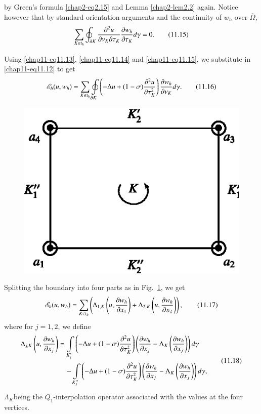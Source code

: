 by Green's formula \eqref{chap2-eq2.15} and Lemma \ref{chap2-lem2.2}
again. Notice however that by standard orientation arguments and the
continuity of $w_{h}$ over $\overline{\Omega}$,
\begin{equation*}
\sum_{K\in\mathfrak{t}_{h}}\oint_{\partial K}\frac{\partial^{2}u}{\partial \nu_{K}\partial
  \tau_{K}}\frac{\partial w_{h}}{\partial
  \tau_{K}}d\gamma=0.\tag{11.15}\label{chap11-eq11.15} 
\end{equation*}

Using \eqref{chap11-eq11.13}, \eqref{chap11-eq11.14} and
\eqref{chap11-eq11.15}, we substitute in \eqref{chap11-eq11.12} to get
\begin{equation*}
\mathscr{E}_{h}(u,w_{h})=\sum_{K\in\mathfrak{t}_{h}}\oint\limits_{\partial
  K}\left(-\Delta u+(1-\sigma)\frac{\partial^{2}u}{\partial
  \tau^{2}_{K}}\right)\frac{\partial w_{h}}{\partial
  \nu_{K}}d\gamma.\tag{11.16}\label{chap11-eq11.16} 
\end{equation*}
\begin{figure}[H]
\centering
\includegraphics{figure/fig11.2.eps}
\caption{}\label{chap11-fig11.2}
\end{figure}

Splitting the boundary into four parts as in
Fig.~\ref{chap11-fig11.2}, we get
\begin{equation*}
\mathscr{E}_{h}(u,w_{h})=\sum_{K\in\mathfrak{t}_{h}}\left(\Delta_{1,K}\left(u,\frac{\partial
  w_{h}}{\partial x_{1}}\right)+\Delta_{2,K}\left(u,\frac{\partial w_{h}}{\partial
  x_{2}}\right)\right),\tag{11.17}\label{chap11-eq11.17} 
\end{equation*}
where for $j=1,2$, we define
\begin{equation*}
\begin{split}
 \Delta_{j,K}\left(u,\frac{\partial w_{h}}{\partial x_{j}}\right) &=
\int\limits_{K'_{j}}\left(-\Delta u+(1-\sigma)\frac{\partial^{2}u}{\partial
  \tau^{2}_{K}}\right)\left(\frac{\partial w_{h}}{\partial
  x_{j}}-\Lambda_{K}\left(\frac{\partial w_{h}}{\partial
  x_{j}}\right)\right)d\gamma\\
&\quad -\int\limits_{K''_{j}}\left(-\Delta
u+(1-\sigma)\frac{\partial^{2}u}{\partial \tau^{2}_{K}}\right)\left(\frac{\partial
  w_{h}}{\partial x_{j}}-\Lambda_{K}\left(\frac{\partial w_{h}}{\partial
  x_{j}}\right)\right)d\gamma, 
\end{split}\tag{11.18}\label{chap11-eq11.18}
\end{equation*}
$\Lambda_{K}$\pageoriginale being the $Q_{1}$-interpolation operator
associated with the values at the four vertices.

